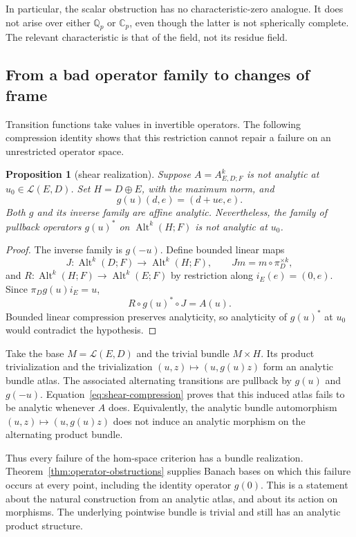 \documentclass[11pt]{amsart}
\newtheorem{proposition}[theorem]{Proposition}
\theoremstyle{definition}
\theoremstyle{remark}
\numberwithin{equation}{section}
\newcommand{\cL}{\mathcal L}
\newcommand{\Alt}{\operatorname{Alt}}
\begin{document}
In particular, the scalar obstruction has no characteristic-zero analogue. It does not arise over either $\mathbb Q_p$ or $\mathbb C_p$, even though the latter is not spherically complete. The relevant characteristic is that of the field, not its residue field.

\subsection{From a bad operator family to changes of frame}

Transition functions take values in invertible operators. The following compression identity shows that this restriction cannot repair a failure on an unrestricted operator space.

\begin{proposition}[shear realization]\label{prop:shear}
Suppose $A=A^k_{E,D;F}$ is not analytic at $u_0\in\cL(E,D)$. Set $H=D\oplus E$, with the maximum norm, and
\[
 g(u)(d,e)=(d+ue,e).
\]
Both $g$ and its inverse family are affine analytic. Nevertheless, the family of pullback operators $g(u)^*$ on $\Alt^k(H;F)$ is not analytic at $u_0$.
\end{proposition}

\begin{proof}
The inverse family is $g(-u)$. Define bounded linear maps
\[
 J\colon\Alt^k(D;F)\longrightarrow\Alt^k(H;F),\qquad
 Jm=m\circ\pi_D^{\times k},
\]
and $R\colon\Alt^k(H;F)\to\Alt^k(E;F)$ by restriction along $i_E(e)=(0,e)$. Since $\pi_Dg(u)i_E=u$,
\begin{equation}\label{eq:shear-compression}
 R\circ g(u)^*\circ J=A(u).
\end{equation}
Bounded linear compression preserves analyticity, so analyticity of $g(u)^*$ at $u_0$ would contradict the hypothesis.
\end{proof}

Take the base $M=\cL(E,D)$ and the trivial bundle $M\times H$. Its product trivialization and the trivialization $(u,z)\mapsto(u,g(u)z)$ form an analytic bundle atlas. The associated alternating transitions are pullback by $g(u)$ and $g(-u)$. Equation~\eqref{eq:shear-compression} proves that this induced atlas fails to be analytic whenever $A$ does. Equivalently, the analytic bundle automorphism $(u,z)\mapsto(u,g(u)z)$ does not induce an analytic morphism on the alternating product bundle.

Thus every failure of the hom-space criterion has a bundle realization. Theorem~\ref{thm:operator-obstructions} supplies Banach bases on which this failure occurs at every point, including the identity operator $g(0)$. This is a statement about the natural construction from an analytic atlas, and about its action on morphisms. The underlying pointwise bundle is trivial and still has an analytic product structure.
\end{document}
